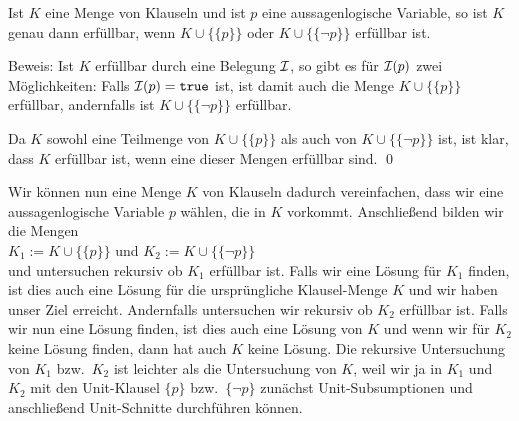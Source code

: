 \begin{Satz}
  Ist $K$ eine Menge von Klauseln und ist $p$ eine aussagenlogische Variable, 
  so ist $K$ genau dann erf\"{u}llbar, wenn $K \cup \bigl\{\{p\}\bigr\}$ oder 
  $K \cup \bigl\{\{\neg p\}\bigr\}$ erf\"{u}llbar ist.  
\end{Satz}
Beweis: 
Ist $K$ erf\"{u}llbar durch eine
Belegung $\mathcal{I}$, so gibt es f\"{u}r  $\mathcal{I}(p)$ zwei M\"{o}glichkeiten:  Falls $\mathcal{I}(p) = \texttt{true}$ ist, ist
damit auch die Menge $K \cup \bigl\{\{p\}\bigr\}$ erf\"{u}llbar, andernfalls ist
$K \cup \bigl\{\{\neg p\}\bigr\}$ erf\"{u}llbar. 

Da $K$ sowohl eine Teilmenge von $K \cup \bigl\{\{p\}\bigr\}$ als auch von 
$K \cup \bigl\{\{\neg p\}\bigr\}$ ist, ist klar, dass $K$ erf\"{u}llbar
ist, wenn eine dieser Mengen erf\"{u}llbar sind.  
\qed

Wir k\"{o}nnen nun eine Menge $K$ von Klauseln dadurch vereinfachen, dass wir eine
aussagenlogische Variable $p$ w\"{a}hlen, die in $K$ vorkommt.
Anschlie\ss{}end bilden wir die Mengen \\[0.2cm]
\hspace*{1.3cm} $K_1 := K \cup \bigl\{\{p\}\bigr\}$ \quad und \quad $K_2 := K \cup
\bigl\{\{\neg p\}\bigr\}$
\\[0.2cm]
und untersuchen rekursiv ob $K_1$ erf\"{u}llbar ist.  Falls wir eine L\"{o}sung f\"{u}r $K_1$ finden,
ist dies auch eine L\"{o}sung f\"{u}r die urspr\"{u}ngliche Klausel-Menge $K$ und wir haben unser Ziel
erreicht.
Andernfalls untersuchen wir rekursiv ob $K_2$ erf\"{u}llbar ist.
Falls wir nun eine L\"{o}sung finden, ist dies auch eine L\"{o}sung von $K$ und wenn wir f\"{u}r $K_2$
keine L\"{o}sung finden, dann hat auch $K$ keine L\"{o}sung.
Die rekursive Untersuchung von $K_1$ bzw.~$K_2$ ist leichter als die Untersuchung von $K$,
weil wir ja in $K_1$ und $K_2$ mit den Unit-Klausel $\{p\}$ bzw.~$\{\neg p\}$
zun\"{a}chst Unit-Subsumptionen und anschlie\ss{}end Unit-Schnitte durchf\"{u}hren k\"{o}nnen.


